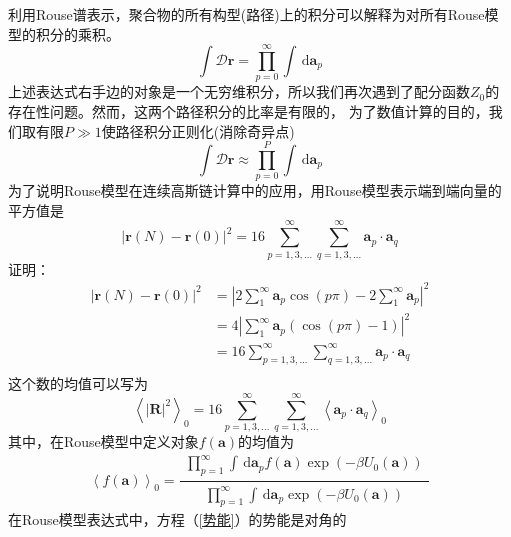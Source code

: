 利用Rouse谱表示，聚合物的所有构型(路径)上的积分可以解释为对所有Rouse模型的积分的乘积。
\begin{equation}
\int \mathcal{D}\mathbf{r}= \prod_{p=0}^{\infty} \int \, \mathrm{d} \mathbf{a}_p
\end{equation}
上述表达式右手边的对象是一个无穷维积分，所以我们再次遇到了配分函数$Z_0$的存在性问题。然而，这两个路径积分的比率是有限的，
为了数值计算的目的，我们取有限$P\gg1$使路径积分正则化(消除奇异点)
\begin{equation}
\int \mathcal{D}\mathbf{r}\approx \prod_{p=0}^{P} \int \, \mathrm{d} \mathbf{a}_p\end{equation}
为了说明Rouse模型在连续高斯链计算中的应用，用Rouse模型表示端到端向量的平方值是
\begin{equation}
\left | \mathbf{r}(N)-\mathbf{r}(0) \right |^2=16\sum_{p=1,3,...}^{\infty}\sum_{q=1,3,...}^{\infty} \mathbf{a}_p \cdot \mathbf{a}_q
\end{equation}
证明：
\begin{equation*}
\begin{aligned}
\left | \mathbf{r}(N)-\mathbf{r}(0) \right |^2 & =\left | 2\sum_{1}^{\infty}\mathbf{a}_p\cos (p\pi)-2\sum_{1}^{\infty}\mathbf{a}_p \right |^2\\ & =4\left | \sum_{1}^{\infty}\mathbf{a}_p(\cos(p\pi)-1) \right |^2 \\ & =16\sum_{p=1,3,...}^{\infty}\sum_{q=1,3,...}^{\infty} \mathbf{a}_p \cdot \mathbf{a}_q\\
\end{aligned}
\end{equation*}
这个数的均值可以写为
\begin{equation}
\left \langle \left| \mathbf{R} \right|^2 \right \rangle _0=16\sum_{p=1,3,...}^{\infty}\sum_{q=1,3,...}^{\infty} \left \langle \mathbf{a}_p \cdot \mathbf{a}_q \right \rangle _0 \label{端到端向量}
\end{equation}
其中，在Rouse模型中定义对象$f(\mathbf{a})$的均值为
\begin{equation}
\left \langle f(\mathbf{a}) \right \rangle _0=\frac{\begin{matrix} \prod_{p=1}^{\infty} \int \, \mathrm{d} \mathbf{a}_p f(\mathbf{a})\exp(-\beta U_0(\mathbf{a})) \end{matrix}}{\begin{matrix} \prod_{p=1}^{\infty} \int \, \mathrm{d} \mathbf{a}_p \exp(-\beta U_0(\mathbf{a})) \end{matrix}}
\end{equation}
在Rouse模型表达式中，方程（\ref{势能}）的势能是对角的
